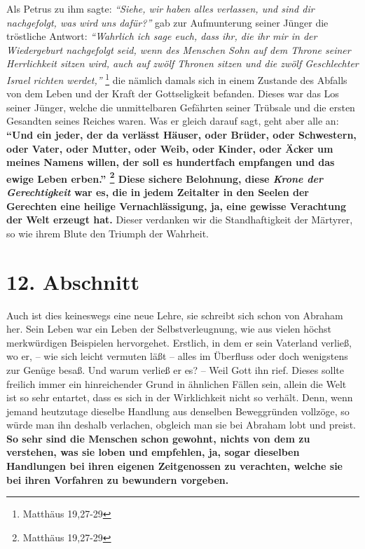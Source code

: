 Als Petrus zu ihm sagte:
\textit{"`Siehe, wir haben alles verlassen, und sind dir
nachgefolgt, was wird uns dafür?"'}
gab zur Aufmunterung seiner Jünger die tröstliche Antwort:
\textit{"`Wahrlich ich sage euch, dass ihr, die ihr mir in der
Wiedergeburt nachgefolgt seid, wenn des Menschen Sohn auf dem Throne seiner
Herrlichkeit sitzen wird, auch auf zwölf Thronen sitzen und die zwölf
Geschlechter Israel richten werdet,"'}
\footnote{Matthäus  19,27-29}
die nämlich
damals sich in einem Zustande des Abfalls von dem Leben und der Kraft der
Gottseligkeit befanden. Dieses war das Los seiner Jünger, welche die
unmittelbaren Gefährten seiner Trübsale und die ersten Gesandten seines
Reiches waren. Was er gleich darauf sagt, geht aber alle an:
\textbf{ "`Und ein
jeder, der da verlässt Häuser, oder Brüder, oder Schwestern, oder Vater, oder
Mutter, oder Weib, oder Kinder, oder Äcker um meines Namens willen, der
soll es hundertfach empfangen und das ewige Leben erben."'
\footnote{Matthäus  19,27-29}
Diese sichere Belohnung, diese
\textit{Krone der Gerechtigkeit} 
war es, die in jedem Zeitalter in den Seelen der Gerechten
eine heilige Vernachlässigung, ja, eine gewisse Verachtung der Welt erzeugt
hat.} Dieser verdanken wir die Standhaftigkeit der Märtyrer, 
so wie ihrem
Blute den Triumph der Wahrheit.

\section{12. Abschnitt} \label{kap4_ab12}

Auch ist dies keineswegs eine neue Lehre, sie schreibt sich schon von
Abraham  her. Sein Leben war ein Leben der
Selbstverleugnung, wie aus vielen
höchst merkwürdigen Beispielen hervorgehet. Erstlich, in dem er sein Vaterland
verließ, wo er, -- wie sich leicht vermuten läßt -- alles im Überfluss oder
doch wenigstens zur Genüge besaß. Und warum verließ er es? -- Weil Gott ihn
rief. Dieses sollte freilich immer ein hinreichender Grund in ähnlichen Fällen
sein, allein die Welt ist so sehr entartet, dass es sich in der Wirklichkeit
nicht so verhält. Denn, wenn jemand heutzutage dieselbe Handlung aus denselben
Beweggründen vollzöge, so würde man ihn deshalb verlachen, obgleich man sie bei
Abraham lobt und preist. \textbf{So sehr sind die Menschen schon gewohnt,
nichts von
dem zu verstehen, was sie loben und empfehlen, ja, sogar dieselben Handlungen
bei ihren eigenen Zeitgenossen zu verachten, welche sie bei ihren Vorfahren zu
bewundern vorgeben.}

